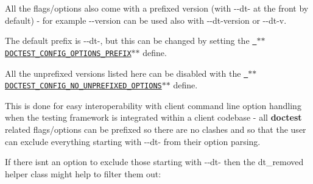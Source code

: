 All the flags/options also come with a prefixed version (with {\ttfamily -\/-\/dt-\/} at the front by default) -\/ for example {\ttfamily -\/-\/version} can be used also with {\ttfamily -\/-\/dt-\/version} or {\ttfamily -\/-\/dt-\/v}.

The default prefix is {\ttfamily -\/-\/dt-\/}, but this can be changed by setting the \href{configuration.md\#doctest_config_options_prefix}{\texttt{ $\ast$$\ast${\ttfamily DOCTEST\+\_\+\+CONFIG\+\_\+\+OPTIONS\+\_\+\+PREFIX}$\ast$$\ast$}} define.

All the unprefixed versions listed here can be disabled with the \href{configuration.md\#doctest_config_no_unprefixed_options}{\texttt{ $\ast$$\ast${\ttfamily DOCTEST\+\_\+\+CONFIG\+\_\+\+NO\+\_\+\+UNPREFIXED\+\_\+\+OPTIONS}$\ast$$\ast$}} define.

This is done for easy interoperability with client command line option handling when the testing framework is integrated within a client codebase -\/ all {\bfseries{doctest}} related flags/options can be prefixed so there are no clashes and so that the user can exclude everything starting with {\ttfamily -\/-\/dt-\/} from their option parsing.

If there isn\textquotesingle{}t an option to exclude those starting with {\ttfamily -\/-\/dt-\/} then the {\ttfamily dt\+\_\+removed} helper class might help to filter them out\+:


